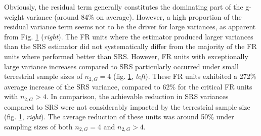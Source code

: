 Obviously, the residual term generally constitutes the dominating part of the \psmall{} g-weight variance (around 84\% on average). However, a high proportion of the residual variance term seems not to be the driver for large \psmall{} variances, as apparent from Fig. \ref{fig:fail} (\textit{right}). The FR units where the \psmall{} estimator produced larger variances than the SRS estimator did not systematically differ from the majority of the FR units where \psmall{} performed better than SRS. However, FR units with exceptionally large variance increases compared to SRS particularly occurred under small terrestrial sample sizes of $n_{2,G} = 4$ (fig. \ref{fig:fail}, \textit{left}). These FR units exhibited a 272\% average increase of the SRS variance, compared to 62\% for the critical FR units with $n_{2,G} > 4$. In comparison, the achievable reduction in SRS variances compared to SRS were not considerably impacted by the terrestrial sample size (fig. \ref{fig:fail}, \textit{right}). The average reduction of these units was around 50\% under sampling sizes of both $n_{2,G} = 4$ and $n_{2,G} > 4$. 

\begin{figure}[H]
	\centering
	\caption{}
	\label{fig:fail}
\end{figure}









